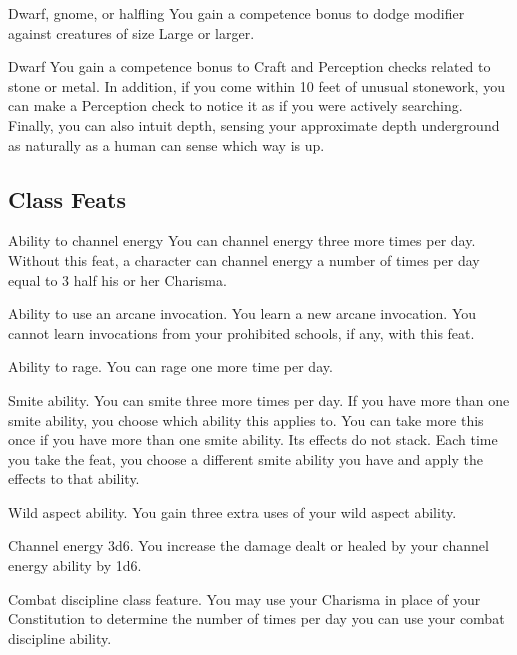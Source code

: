  Dwarf, gnome, or halfling
 You gain a  competence bonus to dodge modifier against creatures of size Large or larger.

 Dwarf
 You gain a  competence bonus to Craft and Perception checks related to stone or metal. In addition, if you come within 10 feet of unusual stonework, you can make a Perception check to notice it as if you were actively searching. Finally, you can also intuit depth, sensing your approximate depth underground as naturally as a human can sense which way is up.

\subsection{Class Feats}

 Ability to channel energy
 You can channel energy three more times per day. 
 Without this feat, a character can channel energy a number of times per day equal to 3 \add half his or her Charisma.

 Ability to use an arcane invocation.
 You learn a new arcane invocation. You cannot learn invocations from your prohibited schools, if any, with this feat.

 Ability to rage.
 You can rage one more time per day.

 Smite ability.
 You can smite three more times per day. If you have more than one smite ability, you choose which ability this applies to.
 You can take more this once if you have more than one smite ability. Its effects do not stack. Each time you take the feat, you choose a different smite ability you have and apply the effects to that ability.

 Wild aspect ability.
 You gain three extra uses of your wild aspect ability.

 Channel energy 3d6.
 You increase the damage dealt or healed by your channel energy ability by 1d6.

\featpre Combat discipline class feature.
\featben You may use your Charisma in place of your Constitution to determine the number of times per day you can use your combat discipline ability. 

